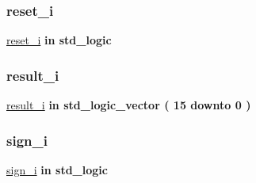 \mbox{\label{classcalc__ctrl_a55da7e76960757f8c6842e86a28ee7be}} 
\subsubsection{\texorpdfstring{reset\+\_\+i}{reset\_i}}
{\footnotesize\ttfamily \hyperlink{classcalc__ctrl_a55da7e76960757f8c6842e86a28ee7be}{reset\+\_\+i} {\bfseries \textcolor{keywordflow}{in}\textcolor{vhdlchar}{ }} {\bfseries \textcolor{comment}{std\+\_\+logic}\textcolor{vhdlchar}{ }} \hspace{0.3cm}{\ttfamily [Port]}}

\mbox{\label{classcalc__ctrl_a58aeef44e9161ee5cb7cc149ac8ee71a}} 
\subsubsection{\texorpdfstring{result\+\_\+i}{result\_i}}
{\footnotesize\ttfamily \hyperlink{classcalc__ctrl_a58aeef44e9161ee5cb7cc149ac8ee71a}{result\+\_\+i} {\bfseries \textcolor{keywordflow}{in}\textcolor{vhdlchar}{ }} {\bfseries \textcolor{comment}{std\+\_\+logic\+\_\+vector}\textcolor{vhdlchar}{ }\textcolor{vhdlchar}{(}\textcolor{vhdlchar}{ }\textcolor{vhdlchar}{ } \textcolor{vhdldigit}{15} \textcolor{vhdlchar}{ }\textcolor{keywordflow}{downto}\textcolor{vhdlchar}{ }\textcolor{vhdlchar}{ } \textcolor{vhdldigit}{0} \textcolor{vhdlchar}{ }\textcolor{vhdlchar}{)}\textcolor{vhdlchar}{ }} \hspace{0.3cm}{\ttfamily [Port]}}

\mbox{\label{classcalc__ctrl_a36cce5b89625a8867788d2fddddd19fd}} 
\subsubsection{\texorpdfstring{sign\+\_\+i}{sign\_i}}
{\footnotesize\ttfamily \hyperlink{classcalc__ctrl_a36cce5b89625a8867788d2fddddd19fd}{sign\+\_\+i} {\bfseries \textcolor{keywordflow}{in}\textcolor{vhdlchar}{ }} {\bfseries \textcolor{comment}{std\+\_\+logic}\textcolor{vhdlchar}{ }} \hspace{0.3cm}{\ttfamily [Port]}}

